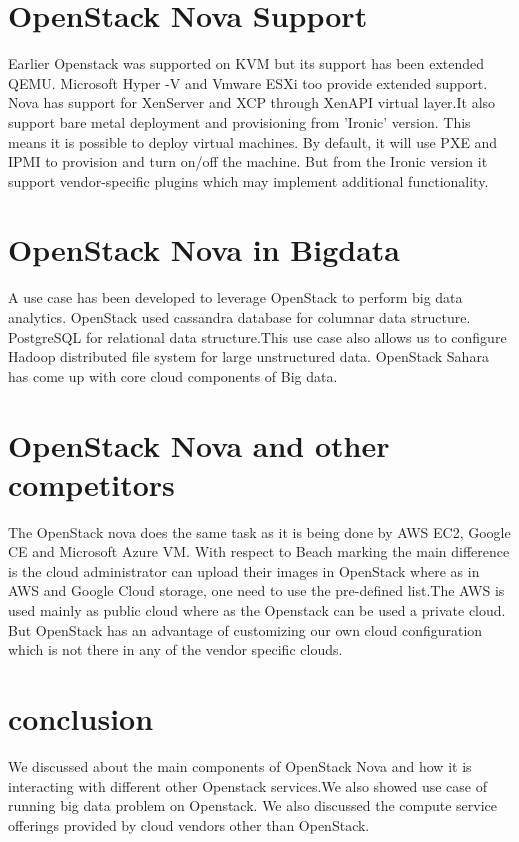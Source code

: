 \documentclass[9pt,twocolumn,twoside]{../../styles/osajnl}
\begin{document}
\section{OpenStack Nova Support}
Earlier Openstack was supported on KVM but its support has been extended QEMU. Microsoft Hyper -V and Vmware ESXi too provide extended support. Nova has support for XenServer and XCP through XenAPI virtual layer.It also support bare metal deployment and provisioning from 'Ironic' version. This means it is possible to deploy virtual machines. By default, it will use PXE and IPMI to provision and turn on/off the machine. But from the Ironic version it support vendor-specific plugins which may implement additional functionality. 


\section{OpenStack Nova in Bigdata}

A use case has been developed to leverage OpenStack to perform big data analytics. OpenStack used cassandra database for columnar data structure. PostgreSQL for relational data structure.This use case also allows us to configure Hadoop distributed file system for large unstructured data. OpenStack Sahara has come up with core cloud components of Big data\cite{www-nova-bigdata}.

\section{OpenStack Nova and other competitors}
 The OpenStack nova does the same task as it is being done by AWS EC2, Google CE and Microsoft Azure VM. With respect to Beach marking the main difference is the cloud administrator can upload their images in OpenStack where as in AWS and Google Cloud storage, one need to use the pre-defined list.The AWS is used mainly as public cloud where as the Openstack can be used a private cloud. But OpenStack has an advantage of customizing our own cloud configuration which is not there in any of the vendor specific clouds.

\section{conclusion}

We discussed about the main components of OpenStack Nova and how it is interacting with different other Openstack services.We also showed use case of running big data problem on Openstack. We also discussed the compute service offerings provided by cloud vendors other than OpenStack.


\end{document}
